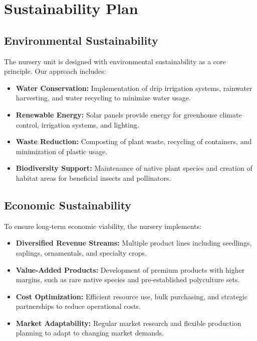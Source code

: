 \section{Sustainability Plan}

\subsection{Environmental Sustainability}

The nursery unit is designed with environmental sustainability as a core principle. Our approach includes:

\begin{itemize}
    \item \textbf{Water Conservation:} Implementation of drip irrigation systems, rainwater harvesting, and water recycling to minimize water usage.
    
    \item \textbf{Renewable Energy:} Solar panels provide energy for greenhouse climate control, irrigation systems, and lighting.
    
    \item \textbf{Waste Reduction:} Composting of plant waste, recycling of containers, and minimization of plastic usage.
    
    \item \textbf{Biodiversity Support:} Maintenance of native plant species and creation of habitat areas for beneficial insects and pollinators.
\end{itemize}

\subsection{Economic Sustainability}

To ensure long-term economic viability, the nursery implements:

\begin{itemize}
    \item \textbf{Diversified Revenue Streams:} Multiple product lines including seedlings, saplings, ornamentals, and specialty crops.
    
    \item \textbf{Value-Added Products:} Development of premium products with higher margins, such as rare native species and pre-established polyculture sets.
    
    \item \textbf{Cost Optimization:} Efficient resource use, bulk purchasing, and strategic partnerships to reduce operational costs.
    
    \item \textbf{Market Adaptability:} Regular market research and flexible production planning to adapt to changing market demands.
\end{itemize}


